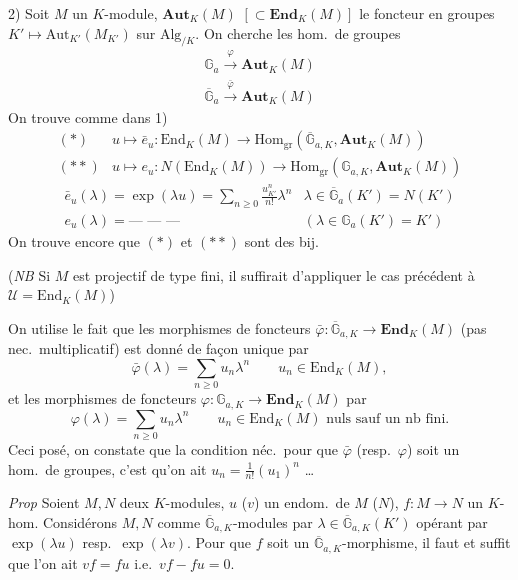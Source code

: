 \documentclass[11pt,a4paper]{article}
\begin{document}
2) Soit $M$ un $K$-module, $\mathbf{Aut}_K(M)$
$[\subset \mathbf{End}_K(M)]$ le foncteur en groupes
$K' \mapsto \mathrm{Aut}_{K'}(M_{K'})$ sur $\mathrm{Alg}_{/K}$. On cherche
les hom.\ de groupes
\[
\begin{array}{l}
\mathbb{G}_a \xrightarrow{\;\varphi\;} \mathbf{Aut}_K(M) \\
\overline{\mathbb{G}}_a \xrightarrow{\;\bar\varphi\;} \mathbf{Aut}_K(M)
\end{array}
\]
On trouve comme dans 1)
\[
\begin{array}{ll}
(*) & u \mapsto \bar e_u : \mathrm{End}_K(M) \to \mathrm{Hom}_{\mathrm{gr}}(\overline{\mathbb{G}}_{a,K}, \mathbf{Aut}_K(M)) \\
(**) & u \mapsto e_u : N(\mathrm{End}_K(M)) \to \mathrm{Hom}_{\mathrm{gr}}(\mathbb{G}_{a,K}, \mathbf{Aut}_K(M))
\end{array}
\]
\[
\begin{array}{ll}
\bar e_u(\lambda) = \exp(\lambda u) = \sum_{n \geq 0} \frac{u^n_{K'}}{n!} \lambda^n & \lambda \in \overline{\mathbb{G}}_a(K') = N(K') \\
e_u(\lambda) = \text{— — —} & (\lambda \in \mathbb{G}_a(K') = K')
\end{array}
\]
On trouve encore que $(*)$ et $(**)$ sont des bij.

(\emph{NB} Si $M$ est projectif de type fini, il suffirait d'appliquer le cas
précédent à $\mathcal{U} = \mathrm{End}_K(M)$)

On utilise le fait que les morphismes de foncteurs
$\bar\varphi : \overline{\mathbb{G}}_{a,K} \to \mathbf{End}_K(M)$ (pas nec.\
multiplicatif) est donné de façon unique par
\[
\bar\varphi(\lambda) = \sum_{n \geq 0} u_n \lambda^n \qquad u_n \in \mathrm{End}_K(M),
\]
et les morphismes de foncteurs
$\varphi : \mathbb{G}_{a,K} \to \mathbf{End}_K(M)$ par
\[
\varphi(\lambda) = \sum_{n \geq 0} u_n \lambda^n \qquad u_n \in \mathrm{End}_K(M) \text{ nuls sauf un nb fini.}
\]
Ceci posé,  on constate que la condition néc.\ pour que
$\bar\varphi$ (resp.\ $\varphi$) soit un hom.\ de groupes, c'est qu'on ait
$u_n = \frac{1}{n!}(u_1)^n$ …

\emph{Prop} Soient $M, N$ deux $K$-modules, $u$ ($v$) un endom.\ de $M$
($N$), $f : M \to N$ un $K$-hom. Considérons $M, N$ comme
$\overline{\mathbb{G}}_{a,K}$-modules par
$\lambda \in \overline{\mathbb{G}}_{a,K}(K')$ opérant par $\exp(\lambda u)$
resp.\ $\exp(\lambda v)$. Pour que $f$ soit un
$\overline{\mathbb{G}}_{a,K}$-morphisme, il faut et suffit que l'on ait
$vf = fu$ i.e.\ $vf - fu = 0$.
\end{document}
